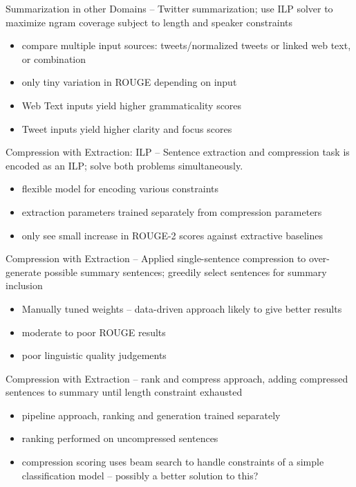 \documentclass{beamer}
\begin{document}
\begin{frame}{Summarization in other Domains}
\cite{liu2011sxsw} -- Twitter summarization; use ILP solver to maximize
    ngram coverage subject to length and speaker constraints
\begin{itemize}
\item compare multiple input sources: tweets/normalized tweets or linked web
 text, or combination 
\item only tiny variation in ROUGE depending on input
\item Web Text inputs yield higher grammaticality scores
\item Tweet inputs yield higher clarity and focus scores
\end{itemize}
\end{frame}

\begin{frame}{Compression with Extraction: ILP}
    \cite{martins2009summarization} -- Sentence extraction and compression
    task is encoded as an ILP; solve both problems simultaneously. 
    \begin{itemize}
    \item flexible model for encoding various constraints
    \item extraction parameters trained separately from compression parameters
    \item only see small increase in ROUGE-2 scores against extractive baselines
    \end{itemize}

\end{frame}


\begin{frame}{Compression with Extraction}
\cite{zajic2006sentence} -- Applied single-sentence compression to 
    over-generate possible summary sentences; greedily select sentences
    for summary inclusion
    \begin{itemize}
    \item Manually tuned weights -- data-driven approach likely to give better
        results
    \item moderate to poor ROUGE results
    \item poor linguistic quality judgements
    \end{itemize}
\end{frame}

\begin{frame}{Compression with Extraction}
    \cite{wang2013sentence} -- rank and compress approach, adding compressed
    sentences to summary until length constraint exhausted
    \begin{itemize}
        \item pipeline approach, ranking and generation trained separately 
        \item ranking performed on uncompressed sentences
        \item compression scoring uses beam search to handle constraints of 
            a simple classification model -- possibly a better solution to this?
    \end{itemize}
\end{frame}
\end{document}
